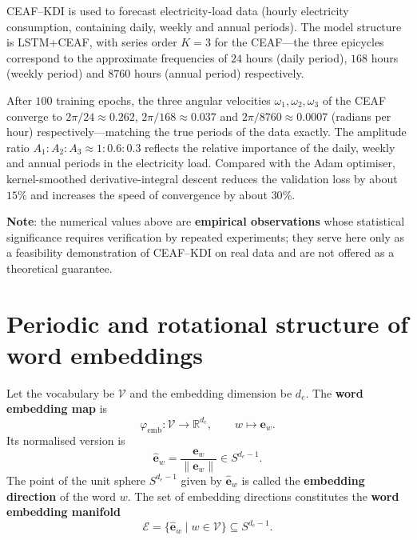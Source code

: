 \begin{example}\label{ex:eaf_kdi_time_series}
CEAF--KDI is used to forecast electricity-load data (hourly electricity consumption, containing daily, weekly and annual periods). The model structure is LSTM+CEAF, with series order $K=3$ for the CEAF---the three epicycles correspond to the approximate frequencies of $24$ hours (daily period), $168$ hours (weekly period) and $8760$ hours (annual period) respectively.

After $100$ training epochs, the three angular velocities $\omega_1, \omega_2, \omega_3$ of the CEAF converge to $2\pi/24 \approx 0.262$, $2\pi/168 \approx 0.037$ and $2\pi/8760 \approx 0.0007$ (radians per hour) respectively---matching the true periods of the data exactly. The amplitude ratio $A_1:A_2:A_3 \approx 1:0.6:0.3$ reflects the relative importance of the daily, weekly and annual periods in the electricity load. Compared with the Adam optimiser, kernel-smoothed derivative-integral descent reduces the validation loss by about $15\%$ and increases the speed of convergence by about $30\%$.

\textbf{Note}: the numerical values above are \textbf{empirical observations} whose statistical significance requires verification by repeated experiments; they serve here only as a feasibility demonstration of CEAF--KDI on real data and are not offered as a theoretical guarantee.
\end{example}

\section{Periodic and rotational structure of word embeddings}
\label{sec:word_embedding_periodicity}

\begin{definition}\label{def:word_embedding_space}
Let the vocabulary be $\mathcal{V}$ and the embedding dimension be $d_e$. The \textbf{word embedding map} is
\[
\varphi_{\text{emb}}:\mathcal{V}\to\mathbb{R}^{d_e},\qquad w\mapsto\mathbf{e}_w.
\]
Its normalised version is
\[
\widehat{\mathbf{e}}_w=\frac{\mathbf{e}_w}{\|\mathbf{e}_w\|}\in S^{d_e-1}.
\]
The point of the unit sphere $S^{d_e-1}$ given by $\widehat{\mathbf{e}}_w$ is called the \textbf{embedding direction} of the word $w$. The set of embedding directions constitutes the \textbf{word embedding manifold}
\[
\mathcal{E}=\{\widehat{\mathbf{e}}_w\mid w\in\mathcal{V}\}\subseteq S^{d_e-1}.
\]
\end{definition}

